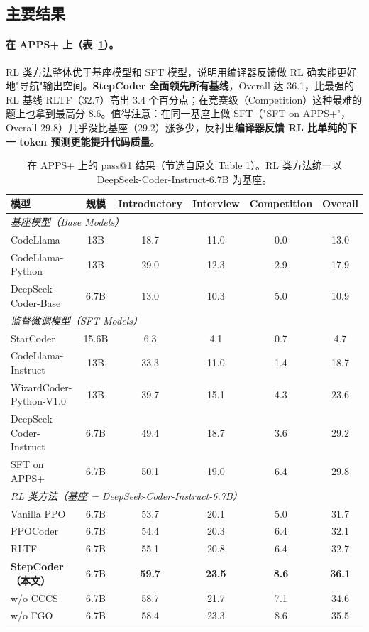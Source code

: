 \documentclass[11pt,UTF8,fontset=fandol]{ctexart}
\begin{document}
\subsection{主要结果}

\paragraph{在 APPS+ 上（表~\ref{tab:apps}）。} RL 类方法整体优于基座模型和 SFT 模型，说明用编译器反馈做 RL 确实能更好地"导航"输出空间。\textbf{StepCoder 全面领先所有基线}，Overall 达 36.1，比最强的 RL 基线 RLTF（32.7）高出 3.4 个百分点；在竞赛级（Competition）这种最难的题上也拿到最高分 8.6。值得注意：在同一基座上做 SFT（"SFT on APPS+"，Overall 29.8）几乎没比基座（29.2）涨多少，反衬出\textbf{编译器反馈 RL 比单纯的下一 token 预测更能提升代码质量}。

\begin{table}[H]\centering\caption{在 APPS+ 上的 pass@1 结果（节选自原文 Table 1）。RL 类方法统一以 DeepSeek-Coder-Instruct-6.7B 为基座。}
\label{tab:apps}
\small
\begin{tabular}{lccccc}
\toprule
模型 & 规模 & Introductory & Interview & Competition & Overall \\
\midrule
\multicolumn{6}{l}{\textit{基座模型（Base Models）}}\\
CodeLlama & 13B & 18.7 & 11.0 & 0.0 & 13.0 \\
CodeLlama-Python & 13B & 29.0 & 12.3 & 2.9 & 17.9 \\
DeepSeek-Coder-Base & 6.7B & 13.0 & 10.3 & 5.0 & 10.9 \\
\midrule
\multicolumn{6}{l}{\textit{监督微调模型（SFT Models）}}\\
StarCoder & 15.6B & 6.3 & 4.1 & 0.7 & 4.7 \\
CodeLlama-Instruct & 13B & 33.3 & 11.0 & 1.4 & 18.7 \\
WizardCoder-Python-V1.0 & 13B & 39.7 & 15.1 & 4.3 & 23.6 \\
DeepSeek-Coder-Instruct & 6.7B & 49.4 & 18.7 & 3.6 & 29.2 \\
SFT on APPS+ & 6.7B & 50.1 & 19.0 & 6.4 & 29.8 \\
\midrule
\multicolumn{6}{l}{\textit{RL 类方法（基座 = DeepSeek-Coder-Instruct-6.7B）}}\\
Vanilla PPO & 6.7B & 53.7 & 20.1 & 5.0 & 31.7 \\
PPOCoder & 6.7B & 54.4 & 20.3 & 6.4 & 32.1 \\
RLTF & 6.7B & 55.1 & 20.8 & 6.4 & 32.7 \\
\textbf{StepCoder（本文）} & 6.7B & \textbf{59.7} & \textbf{23.5} & \textbf{8.6} & \textbf{36.1} \\
\quad w/o CCCS & 6.7B & 58.7 & 21.7 & 7.1 & 34.6 \\
\quad w/o FGO & 6.7B & 58.4 & 23.3 & 8.6 & 35.5 \\
\bottomrule
\end{tabular}
\end{table}
\end{document}
